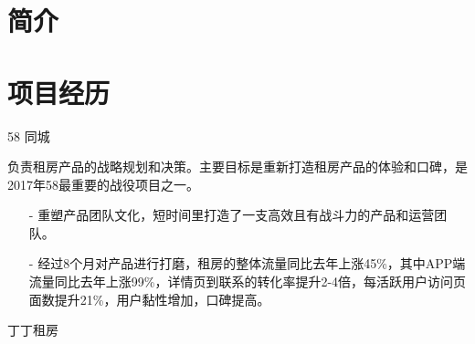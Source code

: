 \documentclass[11pt,a4paper]{moderncv}
\begin{document}
\maketitle


\section{简介}
\vspace{1ex}
\vspace{1ex}

\section{项目经历}
	{ 58 同城}{}{}{}{}

\vspace{1ex}
{
	负责租房产品的战略规划和决策。主要目标是重新打造租房产品的体验和口碑，是2017年58最重要的战役项目之一。
	\vspace{1ex}
	\begin{itemize}  
		\item[-] 重塑产品团队文化，短时间里打造了一支高效且有战斗力的产品和运营团队。
		\vspace{1ex}  
		\item[-] 经过8个月对产品进行打磨，租房的整体流量同比去年上涨45\%，其中APP端流量同比去年上涨99\%，详情页到联系的转化率提升2-4倍，每活跃用户访问页面数提升21\%，用户黏性增加，口碑提高。
	\end{itemize}
}

	{ 丁丁租房}{}{}{}{}
	
\end{document}
